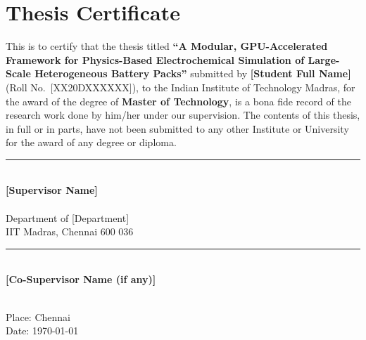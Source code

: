 \chapter*{Thesis Certificate}
\thispagestyle{plain}

\noindent This is to certify that the thesis titled \textbf{``A Modular, GPU-Accelerated Framework for Physics-Based Electrochemical Simulation of Large-Scale Heterogeneous Battery Packs''} submitted by \textbf{[Student Full Name]} (Roll No.\ [XX20DXXXXXX]), to the Indian Institute of Technology Madras, for the award of the degree of \textbf{Master of Technology}, is a bona fide record of the research work done by him/her under our supervision. The contents of this thesis, in full or in parts, have not been submitted to any other Institute or University for the award of any degree or diploma.

\vspace{3cm}

\begin{minipage}[t]{0.45\textwidth}
\centering
\rule{6cm}{0.4pt}\\[4pt]
\textbf{[Supervisor Name]}\\
[Designation]\\
Department of [Department]\\
IIT Madras, Chennai 600 036
\end{minipage}
\hfill
\begin{minipage}[t]{0.45\textwidth}
\centering
\rule{6cm}{0.4pt}\\[4pt]
\textbf{[Co-Supervisor Name (if any)]}\\
[Designation]\\
[Institution]
\end{minipage}

\vspace{2.5cm}
Place: Chennai\\
Date: \today

\newpage
